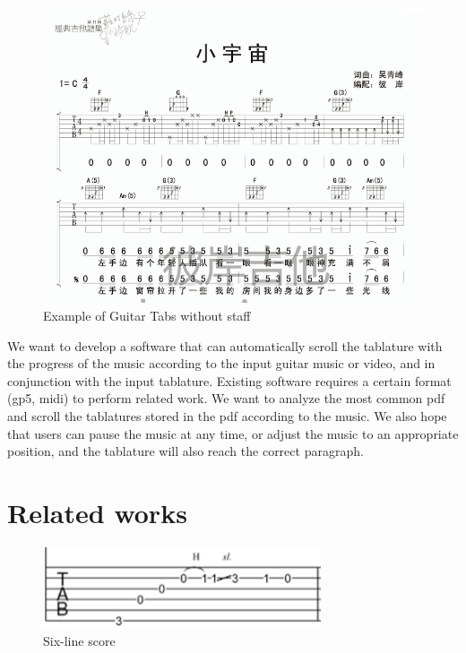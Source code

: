 \documentclass[10pt,twocolumn,letterpaper]{article}
\begin{document}
\begin{CJK}{UTF8}{bsmi}
\begin{figure}[t]
\begin{center}
   \includegraphics[width=0.9\linewidth]{tab2.png}
\end{center}
\caption{Example of Guitar Tabs without staff\cite{small_universe}}
\label{fig:long}
\label{fig:tab2}
\end{figure}

We want to develop a software that can automatically scroll the tablature with the progress of the music according to the input guitar music or video, and in conjunction with the input tablature.
Existing software requires a certain format (gp5, midi) to perform related work. 
We want to analyze the most common pdf and scroll the tablatures stored in the pdf according to the music. 
We also hope that users can pause the music at any time, or adjust the music to an appropriate position, and the tablature will also reach the correct paragraph.

\section{Related works}

\begin{figure}[t]
\begin{center}
   \includegraphics[width=0.8\linewidth]{relate_works_1.png}
\end{center}
    \caption{Six-line score}
\label{fig:relate_works_1}
\end{figure}


\end{CJK}
\end{document}
